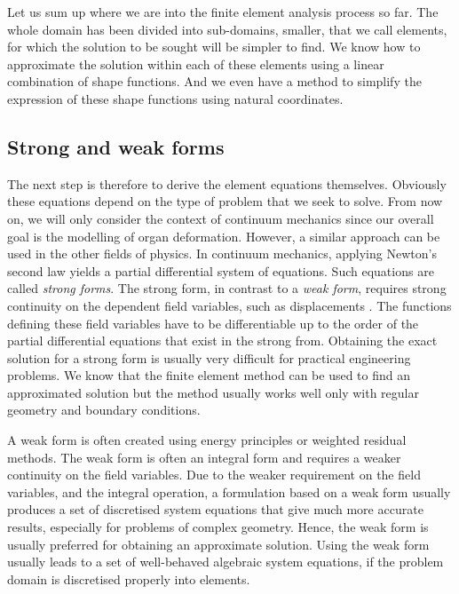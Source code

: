 Let us sum up where we are into the finite element analysis process so far. The whole domain has been divided into sub-domains, smaller, that we call elements, for which the solution to be sought will be simpler to find. We know how to approximate the solution within each of these elements using a linear combination of shape functions. And we even have a method to simplify the expression of these shape functions using natural coordinates. 

	\subsection{Strong and weak forms}
	
The next step is therefore to derive the element equations themselves. Obviously these equations depend on the type of problem that we seek to solve. From now on, we will only consider the context of continuum mechanics since our overall goal is the modelling of organ deformation. However, a similar approach can be used in the other fields of physics. In continuum mechanics, applying Newton's second law yields a partial differential system of equations. Such equations are called \emph{strong forms}. The strong form, in contrast to a \emph{weak form}, requires strong continuity on the dependent field variables, such as displacements \citep{Liu03}. The functions defining these field variables have to be differentiable up to the order of the partial differential equations that exist in the strong from. Obtaining the exact solution for a strong form is usually very difficult for practical engineering problems. We know that the finite element method can be used to find an approximated solution but the method usually works well only with regular geometry and boundary conditions.

A weak form is often created using energy principles or weighted residual methods. The weak form is often an integral form and requires a weaker continuity on the field variables. Due to the weaker requirement on the field variables, and the integral operation, a formulation based on a weak form usually produces a set of discretised system equations that give much more accurate results, especially for problems of complex geometry. Hence, the weak form is usually preferred for obtaining an approximate solution. Using the weak form usually leads to a set of well-behaved algebraic system equations, if the problem domain is discretised properly into elements.

